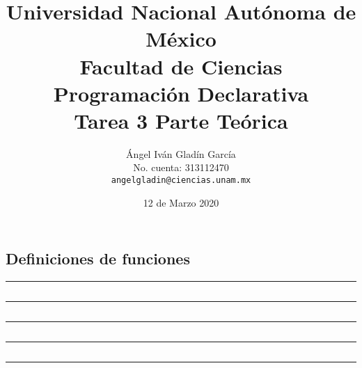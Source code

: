 \documentclass[11pt,letterpaper]{article}
\begin{document}
\title{
        Universidad Nacional Autónoma de México\\
        Facultad de Ciencias\\
        Programación Declarativa\\
    \vspace{.5cm}
    \large
        \textbf{Tarea 3} Parte Teórica
}
\author{
    Ángel Iván Gladín García\\
    No. cuenta: 313112470\\
    \texttt{angelgladin@ciencias.unam.mx}
}
\date{12 de Marzo 2020}
\maketitle

\newtheorem{theorem}{Teorema}
\newtheorem{example}{Ejemplo}
\newtheorem{corollary}{Corolario}
\newtheorem{lemma}{Lemma}
\newtheorem{definition}{Definicion}
\newtheorem{prop}{Proposicion}



\subsection*{Definiciones de funciones}

\noindent
{\color{WildStrawberry} \rule{\linewidth}{0.4mm} }

\inputminted{haskell}{assets/def-map.hs}

\noindent
{\color{WildStrawberry} \rule{\linewidth}{0.4mm} }

\inputminted{haskell}{assets/def-flip.hs}

\noindent
{\color{WildStrawberry} \rule{\linewidth}{0.4mm} }

\inputminted{haskell}{assets/def-concat.hs}

\noindent
{\color{WildStrawberry} \rule{\linewidth}{0.4mm} }

\inputminted{haskell}{assets/def-foldr.hs}

\noindent
{\color{WildStrawberry} \rule{\linewidth}{0.4mm} }
\end{document}
